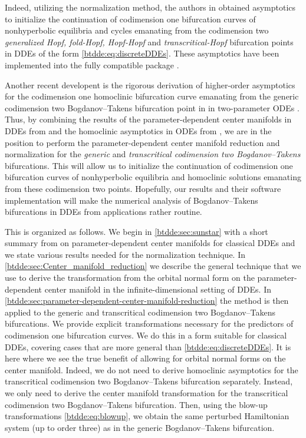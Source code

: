 Indeed, utilizing the normalization method, the authors in \cite{Switching2019} obtained asymptotics to initialize the continuation of codimension one bifurcation curves of nonhyperbolic equilibria and cycles emanating from the codimension two \emph{generalized Hopf, fold-Hopf, Hopf-Hopf} and \emph{transcritical-Hopf} bifurcation points in DDEs of the form \cref{btdde:eq:discreteDDEs}. These asymptotics have been implemented into the fully \OCTAVE compatible \MATLAB package \DDEBIFTOOL \cite{DDEBIFTOOL,2014arXiv1406.7144S}.

Another recent developent is the rigorous derivation of higher-order asymptotics for the codimension one homoclinic bifurcation curve emanating from the generic codimension two Bogdanov--Takens bifurcation point in in two-parameter ODEs \cite{Bosschaert@Interplay}. Thus, by combining the results of the parameter-dependent center manifolds in DDEs from \cite{Switching2019} and the homoclinic asymptotics in ODEs from \cite{Bosschaert@Interplay}, we are in the position to perform the parameter-dependent center manifold reduction and normalization for the \emph{generic} and \emph{transcritical codimension two Bogdanov--Takens} bifurcations. This will allow us to initialize the continuation of codimension one bifurcation curves of nonhyperbolic equilibria and homoclinic solutions emanating from these codimension two points. Hopefully, our results and their software implementation will make the numerical analysis of 
Bogdanov--Takens bifurcations in DDEs from applications rather routine.

This \paper{} is organized as follows. We begin in \cref{btdde:sec:sunstar} with a short summary from \cite{Switching2019} on parameter-dependent center manifolds for classical DDEs and we state various results needed for the normalization technique.
In \cref{btdde:sec:Center_manifold_reduction} we describe the general technique that we use to derive the transformation from the orbital normal form on the parameter-dependent center manifold in the infinite-dimensional setting of DDEs.
In \cref{btdde:sec:parameter-dependent-center-manifold-reduction} the method is then applied to the generic and transcritical codimension two Bogdanov--Takens bifurcations. We provide explicit transformations necessary for the predictors of codimension one bifurcation curves. We do this in a form suitable for classical DDEs, covering cases that are more general than \cref{btdde:eq:discreteDDEs}. It is here where we see the true benefit of allowing for orbital normal forms on the center manifold. Indeed, we do not need to derive homoclinic asymptotics for the transcritical codimension two Bogdanov--Takens bifurcation separately. Instead, we only need to derive the center manifold transformation for the transcritical codimension two Bogdanov--Takens bifurcation. Then, using the blow-up transformations \cref{btdde:eq:blowup}, we obtain the same perturbed Hamiltonian system (up to order three) as in the generic Bogdanov--Takens bifurcation.

